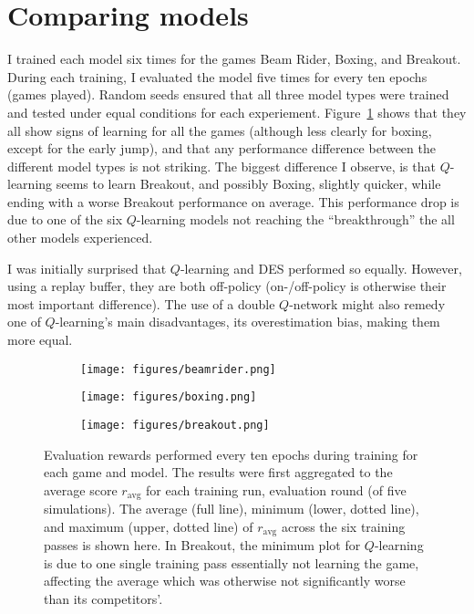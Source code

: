 \documentclass{article}
\begin{document}
\section{Comparing models}
I trained each model six times for the games Beam Rider, Boxing, and Breakout. During each training, I evaluated the model five times for every ten epochs (games played). Random seeds ensured that all three model types were trained and tested under equal conditions for each experiement. Figure~\ref{fig:results} shows that they all show signs of learning for all the games (although less clearly for boxing, except for the early jump), and that any performance difference between the different model types is not striking. The biggest difference I observe, is that \(Q\)-learning seems to learn Breakout, and possibly Boxing, slightly quicker, while ending with a worse Breakout performance on average. This performance drop is due to one of the six \(Q\)-learning models not reaching the ``breakthrough'' the all other models experienced.

I was initially surprised that \(Q\)-learning and DES performed so equally. However, using a replay buffer, they are both off-policy (on-/off-policy is otherwise their most important difference). The use of a double \(Q\)-network might also remedy one of \(Q\)-learning's main disadvantages, its overestimation bias, making them more equal.

\begin{figure}[h]
    \centering
    \begin{subfigure}[b]{0.69\textwidth}
        \texttt{[image: figures/beamrider.png]}
    \end{subfigure}
    
    \begin{subfigure}[b]{0.69\textwidth}
        \texttt{[image: figures/boxing.png]}
    \end{subfigure}
    
    \begin{subfigure}[b]{0.69\textwidth}
        \texttt{[image: figures/breakout.png]}
    \end{subfigure} 
    \caption{Evaluation rewards performed every ten epochs during training for each game and model. The results were first aggregated to the average score \(r_\text{avg}\) for each training run, evaluation round (of five simulations). The average (full line), minimum (lower, dotted line), and maximum (upper, dotted line) of \(r_\text{avg}\) across the six training passes is shown here. In Breakout, the minimum plot for \(Q\)-learning is due to one single training pass essentially not learning the game, affecting the average which was otherwise not significantly worse than its competitors'.}
    \label{fig:results}
\end{figure}
\end{document}
